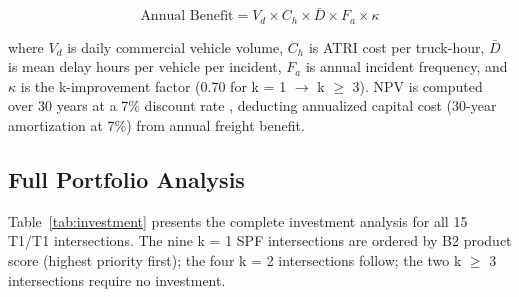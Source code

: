 \begin{equation}
\text{Annual Benefit} = V_d \times C_h \times \bar{D} \times F_a \times \kappa
\label{eq:benefit}
\end{equation}

where $V_d$ is daily commercial vehicle volume, $C_h$ is ATRI cost per truck-hour, $\bar{D}$ is mean delay hours per vehicle per incident, $F_a$ is annual incident frequency, and $\kappa$ is the k-improvement factor (0.70 for k = 1 $\rightarrow$ k $\geq$ 3). NPV is computed over 30 years at a 7\% discount rate \citep{IIJA2021}, deducting annualized capital cost (30-year amortization at 7\%) from annual freight benefit.

\subsection{Full Portfolio Analysis}

Table~\ref{tab:investment} presents the complete investment analysis for all 15 T1/T1 intersections. The nine k = 1 SPF intersections are ordered by B2 product score (highest priority first); the four k = 2 intersections follow; the two k $\geq$ 3 intersections require no investment.

